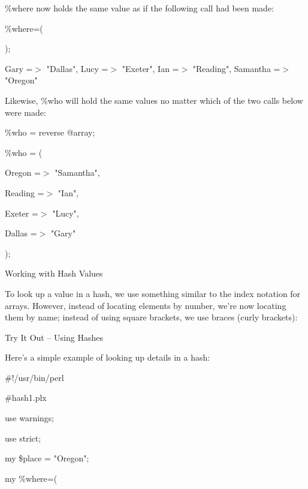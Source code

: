 \documentclass[a4paper,11pt]{book}
\begin{document}
\noindent \%where now holds the same value as if the following call had been made:

\noindent 

\noindent \%where=(

\noindent 

\noindent 

\noindent 

\noindent 

\noindent );

\noindent 

\noindent Gary =$>$ "Dallas", Lucy =$>$ "Exeter", Ian =$>$ "Reading", Samantha =$>$ "Oregon"

\noindent 

\noindent Likewise, \%who will hold the same values no matter which of the two calls below were made:

\noindent 

\noindent \%who = reverse @array;

\noindent \%who = (

\noindent Oregon  =$>$ "Samantha",

\noindent Reading =$>$ "Ian",

\noindent Exeter  =$>$ "Lucy",

\noindent Dallas  =$>$ "Gary"

\noindent );

\noindent 

\noindent Working with Hash Values

\noindent To look up a value in a hash, we use something similar to the index notation for arrays. However, instead of locating elements by number, we're now locating them by name; instead of using square brackets, we use braces (curly brackets):

\noindent 

\noindent Try It Out -- Using Hashes

\noindent 

\noindent Here's a simple example of looking up details in a hash:

\noindent 

\noindent \#!/usr/bin/perl

\noindent \#hash1.plx

\noindent use warnings;

\noindent use strict;

\noindent 

\noindent my \$place = "Oregon";

\noindent my \%where=(
\end{document}
